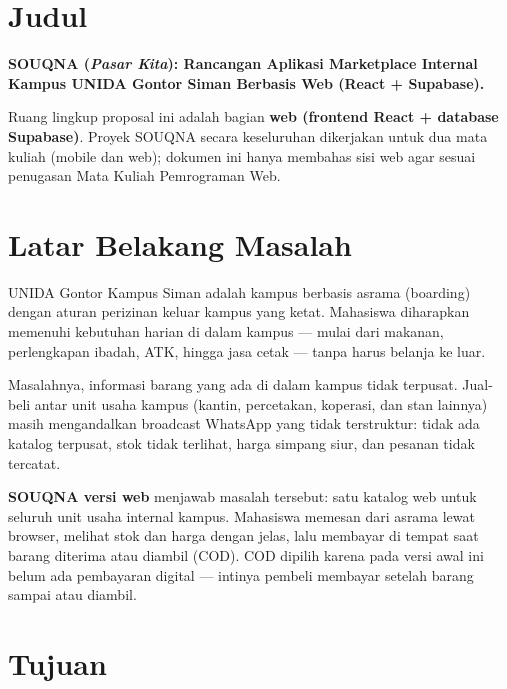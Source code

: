 \documentclass[11pt, a4paper]{article}
\begin{document}
\section{Judul}

\textbf{SOUQNA (\textit{Pasar Kita}): Rancangan Aplikasi Marketplace Internal Kampus UNIDA Gontor Siman Berbasis Web (React + Supabase).}

Ruang lingkup proposal ini adalah bagian \textbf{web (frontend React + database Supabase)}.
Proyek SOUQNA secara keseluruhan dikerjakan untuk dua mata kuliah (mobile dan web);
dokumen ini hanya membahas sisi web agar sesuai penugasan Mata Kuliah Pemrograman Web.

\section{Latar Belakang Masalah}

UNIDA Gontor Kampus Siman adalah kampus berbasis asrama (boarding) dengan aturan
perizinan keluar kampus yang ketat. Mahasiswa diharapkan memenuhi kebutuhan harian
di dalam kampus --- mulai dari makanan, perlengkapan ibadah, ATK, hingga jasa cetak ---
tanpa harus belanja ke luar.

Masalahnya, informasi barang yang ada di dalam kampus tidak terpusat. Jual-beli antar
unit usaha kampus (kantin, percetakan, koperasi, dan stan lainnya) masih mengandalkan
broadcast WhatsApp yang tidak terstruktur: tidak ada katalog terpusat, stok tidak
terlihat, harga simpang siur, dan pesanan tidak tercatat.

\textbf{SOUQNA versi web} menjawab masalah tersebut: satu katalog web untuk seluruh
unit usaha internal kampus. Mahasiswa memesan dari asrama lewat browser, melihat stok
dan harga dengan jelas, lalu membayar di tempat saat barang diterima atau diambil
(COD). COD dipilih karena pada versi awal ini belum ada pembayaran digital --- intinya pembeli membayar setelah barang sampai atau diambil.

\section{Tujuan}
\end{document}
